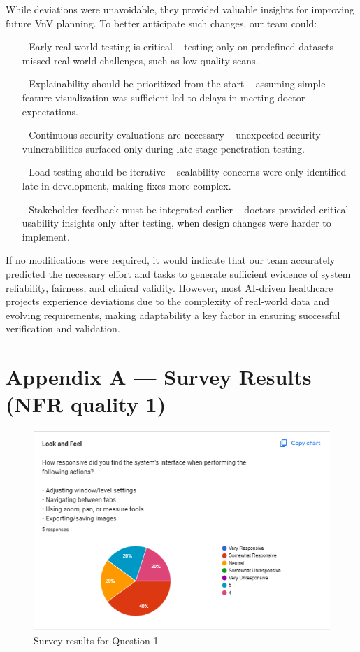 \documentclass[12pt, titlepage]{article}
\begin{document}
    \noindent While deviations were unavoidable, they provided valuable insights for improving future VnV planning. To better anticipate such changes, our team could:
    \begin{itemize}
      \item[-] Early real-world testing is critical – testing only on predefined datasets missed real-world challenges, such as low-quality scans.
      \item[-] Explainability should be prioritized from the start – assuming simple feature visualization was sufficient led to delays in meeting doctor expectations.
      \item[-] Continuous security evaluations are necessary – unexpected security vulnerabilities surfaced only during late-stage penetration testing.
      \item[-] Load testing should be iterative – scalability concerns were only identified late in development, making fixes more complex.
      \item[-] Stakeholder feedback must be integrated earlier – doctors provided critical usability insights only after testing, when design changes were harder to implement.
      \end{itemize}
    
    \noindent If no modifications were required, it would indicate that our team accurately predicted the necessary effort and tasks to generate sufficient evidence of system reliability, fairness, and clinical validity. However, most AI-driven healthcare projects experience deviations due to the complexity of real-world data and evolving requirements, making adaptability a key factor in ensuring successful verification and validation.
  \newpage
  \section*{Appendix A --- Survey Results (NFR quality 1)}
  
  \begin{figure}[ht!] 
    \centering
    \includegraphics[scale=1.3]{../assets/s1.png}
    \caption{Survey results for Question 1}
    \label{fig:survey1}
  \end{figure}
  
\end{document}
